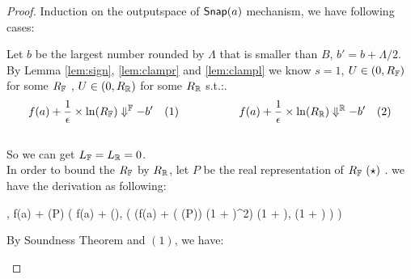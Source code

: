 \documentclass[a4paper,11pt]{article}
\begin{document}
\begin{proof}
%
Induction on the outputspace of $\mathsf{Snap}(a)$ mechanism, we have following cases:
	\begin{itemize}
		Let $b$ be the largest number rounded by $\Lambda$ that is smaller than $B$, $b' = b + \Lambda / 2$.
		\\
		By Lemma \ref{lem:sign}, \ref{lem:clampr} and \ref{lem:clampl} we know $s = 1$, 
		$U \in (0, R_{\mathbb{F}})$ for some $R_{\mathbb{F}}$
		, $U \in (0, R_{\mathbb{R}})$ for some $R_{\mathbb{R}}$ s.t.:.
		$$f(a) + \frac{1}{\epsilon} \times \ln(R_{\mathbb{F}}) \Downarrow^{\mathbb{F}} -b' ~~~ (1)
		~~~~~~~~~~~~~~~~
		f(a) + \frac{1}{\epsilon} \times \ln(R_{\mathbb{R}}) \Downarrow^{\mathbb{R}} -b' ~~~ (2)
		$$
		\\
		So we can get $L_{\mathbb{F}} = L_{\mathbb{R}} = 0$.
		\\
		In order to bound the $R_{\mathbb{F}}$ by $R_{\mathbb{R}}$, let $P$ be the real representation of $\fvalR~(\star)$ . we have the derivation as following:
\\
{\scriptsize
\begin{mathpar}
				{
				\trsenv,
				f(a) +  \times \ln(P)
				\trsto
				\bigg(
				f(a) +  \times \ln(\fvalR),
				\big( (f(a) + 
				( \times \ln(P))
				(1 + \eta)^2)
				{(1 + \eta)},
				{(1 + \eta)}
				 \big)
				\bigg)
				}
		\end{mathpar}	
}		%
		By Soundness Theorem and $(1)$, we have:

\end{itemize}
\end{proof}
\end{document}
